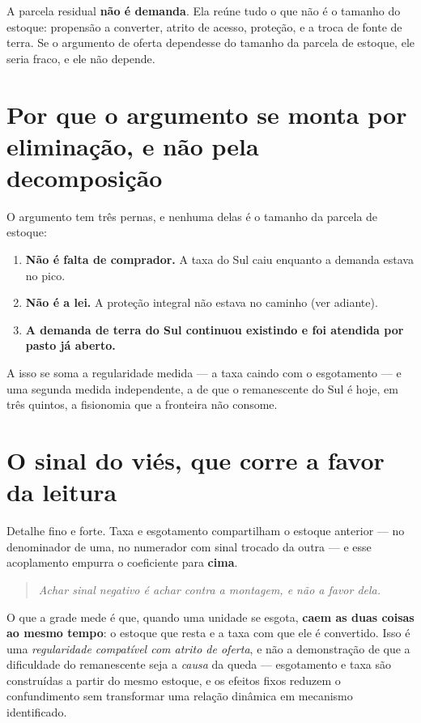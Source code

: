 \begin{armadilha}
A parcela residual \textbf{não é demanda}. Ela reúne tudo o que não é o tamanho
do estoque: propensão a converter, atrito de acesso, proteção, e a troca de
fonte de terra. Se o argumento de oferta dependesse do tamanho da parcela de
estoque, ele seria fraco, e ele não depende.
\end{armadilha}

\section{Por que o argumento se monta por eliminação, e não pela decomposição}

O argumento tem três pernas, e nenhuma delas é o tamanho da parcela de estoque:

\begin{enumerate}
\item \textbf{Não é falta de comprador.} A taxa do Sul caiu enquanto a demanda
estava no pico.
\item \textbf{Não é a lei.} A proteção integral não estava no caminho (ver
adiante).
\item \textbf{A demanda de terra do Sul continuou existindo e foi atendida por
pasto já aberto.}
\end{enumerate}

A isso se soma a regularidade medida --- a taxa caindo com o esgotamento --- e
uma segunda medida independente, a de que o remanescente do Sul é hoje, em três
quintos, a fisionomia que a fronteira não consome.

\section{O sinal do viés, que corre a favor da leitura}

Detalhe fino e forte. Taxa e esgotamento compartilham o estoque anterior --- no
denominador de uma, no numerador com sinal trocado da outra --- e esse
acoplamento empurra o coeficiente para \textbf{cima}.

\begin{quote}\itshape\color{cortinta}
Achar sinal negativo é achar \emph{contra} a montagem, e não a favor dela.
\end{quote}

\begin{naodiz}
O que a grade mede é que, quando uma unidade se esgota, \textbf{caem as duas
coisas ao mesmo tempo}: o estoque que resta e a taxa com que ele é convertido.
Isso é uma \emph{regularidade compatível com atrito de oferta}, e não a
demonstração de que a dificuldade do remanescente seja a \emph{causa} da queda
--- esgotamento e taxa são construídas a partir do mesmo estoque, e os efeitos
fixos reduzem o confundimento sem transformar uma relação dinâmica em mecanismo
identificado.
\end{naodiz}

